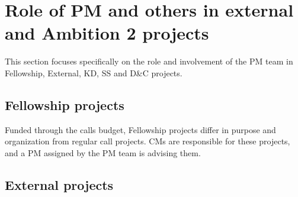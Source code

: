 \section{Role of PM and others in external and Ambition 2 projects}
\label{app:pm-role}

This section focuses specifically on the role and involvement of the PM team in Fellowship,
External, KD, SS and D\&C projects.


\subsection{Fellowship projects}
Funded through the calls budget, Fellowship projects differ in purpose and organization from regular 
call projects. CMs are responsible for these projects, and a PM assigned by the PM team is advising them.

\subsection{External projects}

